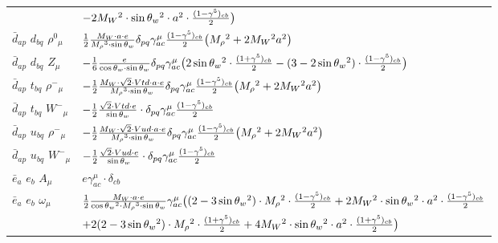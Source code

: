 \begin{center}
\begin{tabular}{|l|l|}
  & $-2 M_W{}^2 \cdot  \sin{\theta}_w{}^2 \cdot  a{}^2 \cdot {(1-\gamma^5)_{c b}\over 2} \big)$\\[2mm]
$\bar{d}{}_{a p }$ \phantom{-} $d{}_{b q }$ \phantom{-} $\rho^0{}_{\mu }$ \phantom{-}  &
	$\frac{1}{2}\frac{ M_W \cdot a \cdot e}{ M_\rho{}^3  \cdot \sin{\theta}_w}\delta_{p q} \gamma_{a c}^\mu {(1-\gamma^5)_{c b}\over 2} \big( M_\rho{}^2 +2 M_W{}^2  a{}^2 \big)$\\[2mm]
$\bar{d}{}_{a p }$ \phantom{-} $d{}_{b q }$ \phantom{-} ${Z}_{\mu }$ \phantom{-}  &
	$-\frac{1}{6}\frac{ e}{ \cos{\theta}_w \cdot \sin{\theta}_w}\delta_{p q} \gamma_{a c}^\mu \big(2 \sin{\theta}_w{}^2 \cdot {(1+\gamma^5)_{c b}\over 2} - (3-2 \sin{\theta}_w {}^2)\cdot {(1-\gamma^5)_{c b}\over 2} \big)$\\[2mm]
$\bar{d}{}_{a p }$ \phantom{-} $t{}_{b q }$ \phantom{-} $\rho^-{}_{\mu }$ \phantom{-}  &
	$-\frac{1}{2}\frac{ M_W \cdot\sqrt{2} \cdot Vtd \cdot a \cdot e}{ M_\rho{}^3  \cdot \sin{\theta}_w}\delta_{p q} \gamma_{a c}^\mu {(1-\gamma^5)_{c b}\over 2} \big( M_\rho{}^2 +2 M_W{}^2  a{}^2 \big)$\\[2mm]
$\bar{d}{}_{a p }$ \phantom{-} $t{}_{b q }$ \phantom{-} $W^-{}_{\mu }$ \phantom{-}  &
	$-\frac{1}{2}\frac{\sqrt{2} \cdot Vtd \cdot e}{ \sin{\theta}_w}\cdot \delta_{p q} \gamma_{a c}^\mu {(1-\gamma^5)_{c b}\over 2} $\\[2mm]
$\bar{d}{}_{a p }$ \phantom{-} $u{}_{b q }$ \phantom{-} $\rho^-{}_{\mu }$ \phantom{-}  &
	$-\frac{1}{2}\frac{ M_W \cdot\sqrt{2} \cdot Vud \cdot a \cdot e}{ M_\rho{}^3  \cdot \sin{\theta}_w}\delta_{p q} \gamma_{a c}^\mu {(1-\gamma^5)_{c b}\over 2} \big( M_\rho{}^2 +2 M_W{}^2  a{}^2 \big)$\\[2mm]
$\bar{d}{}_{a p }$ \phantom{-} $u{}_{b q }$ \phantom{-} $W^-{}_{\mu }$ \phantom{-}  &
	$-\frac{1}{2}\frac{\sqrt{2} \cdot Vud \cdot e}{ \sin{\theta}_w}\cdot \delta_{p q} \gamma_{a c}^\mu {(1-\gamma^5)_{c b}\over 2} $\\[2mm]
$\bar{e}{}_{a }$ \phantom{-} $e{}_{b }$ \phantom{-} ${A}_{\mu }$ \phantom{-}  &
	$ e\gamma_{a c}^\mu \cdot \delta_{c b} $\\[2mm]
$\bar{e}{}_{a }$ \phantom{-} $e{}_{b }$ \phantom{-} $\omega{}_{\mu }$ \phantom{-}  &
	$\frac{1}{2}\frac{ M_W \cdot a \cdot e}{ \cos{\theta}_w{}^2  \cdot M_\rho{}^3  \cdot \sin{\theta}_w}\gamma_{a c}^\mu \big( (2-3 \sin{\theta}_w {}^2)\cdot  M_\rho{}^2 \cdot {(1-\gamma^5)_{c b}\over 2} +2 M_W{}^2 \cdot  \sin{\theta}_w{}^2 \cdot  a{}^2 \cdot {(1-\gamma^5)_{c b}\over 2} $ \\[2mm]
  & $+2 (2-3 \sin{\theta}_w {}^2)\cdot  M_\rho{}^2 \cdot {(1+\gamma^5)_{c b}\over 2} +4 M_W{}^2 \cdot  \sin{\theta}_w{}^2 \cdot  a{}^2 \cdot {(1+\gamma^5)_{c b}\over 2} \big)$\\[2mm]

\end{tabular}
\end{center}
